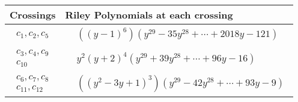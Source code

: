\documentclass[1p]{elsarticle_modified}
\theoremstyle{definition}
\begin{document}
\begin{tabular}{m{50pt}|m{274pt}}
Crossings & \hspace{64pt}Riley Polynomials at each crossing \\
\hline $$\begin{aligned}c_{1},c_{2},c_{5}\end{aligned}$$&$\begin{aligned}
&((y-1)^6)(y^{29}-35 y^{28}+\cdots+2018 y-121)
\end{aligned}$\\
\hline $$\begin{aligned}c_{3},c_{4},c_{9}\\c_{10}\end{aligned}$$&$\begin{aligned}
&y^2(y+2)^4(y^{29}+39 y^{28}+\cdots+96 y-16)
\end{aligned}$\\
\hline $$\begin{aligned}c_{6},c_{7},c_{8}\\c_{11},c_{12}\end{aligned}$$&$\begin{aligned}
&((y^2-3 y+1)^3)(y^{29}-42 y^{28}+\cdots+93 y-9)
\end{aligned}$\\
\hline
\end{tabular}
\vskip 2pc
\end{document}

